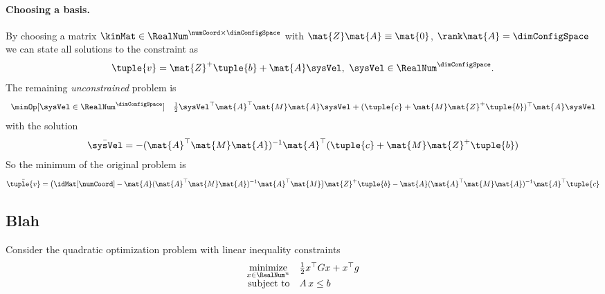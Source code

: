 \paragraph{Choosing a basis.}
By choosing a matrix $\kinMat\in\RealNum^{\numCoord\times\dimConfigSpace}$ with $\mat{Z}\mat{A} \equiv \mat{0}$, $\rank\mat{A}=\dimConfigSpace$ we can state all solutions to the constraint as 
\begin{align}
 \tuple{v} = \mat{Z}^+ \tuple{b} + \mat{A} \sysVel, \ \sysVel\in \RealNum^\dimConfigSpace. 
\end{align}
The remaining \textit{unconstrained} problem is
\begin{align}
 \begin{array}{rl}
  \minOp[\sysVel\in\RealNum^\dimConfigSpace] & \tfrac{1}{2} \sysVel^\top \mat{A}^\top\mat{M}\mat{A} \sysVel + (\tuple{c} + \mat{M}\mat{Z}^+\tuple{b})^\top \mat{A} \sysVel
 \end{array}
\end{align}
with the solution
\begin{align}
 \bar{\sysVel} = -(\mat{A}^\top\mat{M}\mat{A})^{-1} \mat{A}^\top (\tuple{c} + \mat{M}\mat{Z}^+\tuple{b})
\end{align}
So the minimum of the original problem is
\begin{align}
 \bar{\tuple{v}} = \big(\idMat[\numCoord] - \mat{A} (\mat{A}^\top\mat{M}\mat{A})^{-1} \mat{A}^\top \mat{M} \big) \mat{Z}^+ \tuple{b} - \mat{A} (\mat{A}^\top\mat{M}\mat{A})^{-1} \mat{A}^\top \tuple{c}
\end{align}

\subsection{Blah}
Consider the quadratic optimization problem with linear inequality constraints
\begin{align}
 \begin{array}{rl}
  \underset{x \in \RealNum^{n}}{\text{minimize}} & \tfrac{1}{2} x^\top G x + x^\top g
  \\[1ex]
  \text{subject to} & A\,x \leq b
 \end{array}
\end{align}

